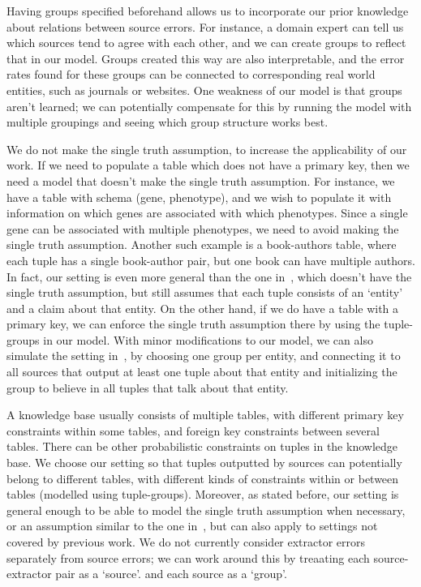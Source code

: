 \documentclass{sig-alternate}
\newcounter{prob}
\begin{document}
Having groups specified beforehand allows us to incorporate our prior knowledge about relations between source errors. For instance, a domain expert can tell us which sources tend to agree with each other, and we can create groups to reflect that in our model. Groups created this way are also interpretable, and the error rates found for these groups can be connected to corresponding real world entities, such as journals or websites. One weakness of our model is that groups aren't learned; we can potentially compensate for this by running the model with multiple groupings and seeing which group structure works best. 

We do not make the single truth assumption, to increase the applicability of our work. If we need to populate a table which does not have a primary key, then we need a model that doesn't make the single truth assumption. For instance, we have a table with schema (gene, phenotype), and we wish to populate it with information on which genes are associated with which phenotypes. Since a single gene can be associated with multiple phenotypes, we need to avoid making the single truth assumption. Another such example is a book-authors table, where each tuple has a single book-author pair, but one book can have multiple authors. In fact, our setting is even more general than the one in~\cite{Zhao:2012:BAD:2168651.2168656}, which doesn't have the single truth assumption, but still assumes that each tuple consists of an `entity' and a claim about that entity. 
On the other hand, if we do have a table with a primary key, we can enforce the single truth assumption there by using the tuple-groups in our model. With minor modifications to our model, we can also simulate the setting in~\cite{Zhao:2012:BAD:2168651.2168656}, by choosing one group per entity, and connecting it to all sources that output at least one tuple about that entity and initializing the group to believe in all tuples that talk about that entity. 

A knowledge base usually consists of multiple tables, with different primary key constraints within some tables, and foreign key constraints between several tables.
There can be other probabilistic constraints on tuples in the knowledge base. We choose our setting so that tuples outputted by sources can potentially belong to different tables, with different kinds of constraints within or between tables (modelled using tuple-groups). Moreover, as stated before, our setting is general enough to be able to model the single truth assumption when necessary, or an assumption similar to the one in~\cite{Zhao:2012:BAD:2168651.2168656}, but can also apply to settings not covered by previous work. We do not currently consider extractor errors separately from source errors; we can work around this by treaating each source-extractor pair as a `source'. and each source as a `group'. 
\end{document}

